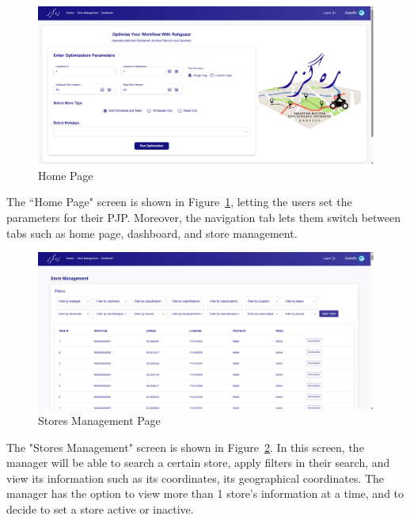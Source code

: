 \begin{figure}[H]
    \centering
    \includegraphics[width=1\textwidth]{images/Home.png} %
    \caption{Home Page}
    \label{fig:image3}
\end{figure}
The ``Home Page" screen is shown in Figure~\ref{fig:image3}, letting the users set the parameters for their PJP. Moreover, the navigation tab lets them switch between tabs such as home page, dashboard, and store management.


\begin{figure}[H]
    \centering
    \includegraphics[width=1\textwidth]{images/View Stores.png} %
    \caption{Stores Management Page}
    \label{fig:image5}
\end{figure}
The "Stores Management" screen is shown in Figure~\ref{fig:image5}. In this screen, the manager will be able to search a certain store, apply filters in their search, and view its information such as its coordinates, its geographical coordinates. The manager has the option to view more than 1 store's information at a time, and to decide to set a store active or inactive.

